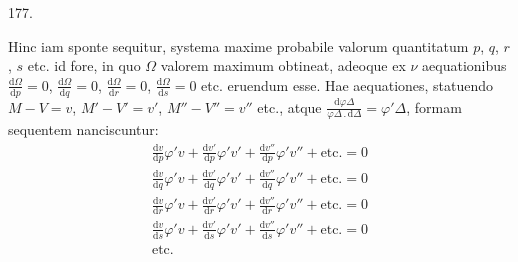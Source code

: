 \begin{center}\hypertarget{native-249-article177}{}177.\end{center}
Hinc iam sponte sequitur, systema maxime probabile valorum quantitatum
$p$, $q$, $r$, $s$ etc. id fore, in quo $\Omega$ valorem maximum obtineat,
adeoque ex $\nu$ aequationibus $\frac{\mathrm{d}\Omega}{\mathrm{d}p}=0$,
$\frac{\mathrm{d}\Omega}{\mathrm{d}q}=0$,
$\frac{\mathrm{d}\Omega}{\mathrm{d}r}=0$,
$\frac{\mathrm{d}\Omega}{\mathrm{d}s}=0$ etc. eruendum esse. Hae aequationes,
statuendo $M-V=v$, $M'-V'=v'$, $M''-V''=v''$ etc., atque
$\frac{\mathrm{d}\varphi\Delta}{\varphi\Delta\,.\,\mathrm{d}\Delta}=\varphi'\Delta$,
formam sequentem nanciscuntur:
\[
\begin{gathered}
\frac{\mathrm{d}v}{\mathrm{d}p}\varphi'v+
\frac{\mathrm{d}v'}{\mathrm{d}p}\varphi'v'+
\frac{\mathrm{d}v''}{\mathrm{d}p}\varphi'v''+\text{etc.}=0\\
\frac{\mathrm{d}v}{\mathrm{d}q}\varphi'v+
\frac{\mathrm{d}v'}{\mathrm{d}q}\varphi'v'+
\frac{\mathrm{d}v''}{\mathrm{d}q}\varphi'v''+\text{etc.}=0\\
\frac{\mathrm{d}v}{\mathrm{d}r}\varphi'v+
\frac{\mathrm{d}v'}{\mathrm{d}r}\varphi'v'+
\frac{\mathrm{d}v''}{\mathrm{d}r}\varphi'v''+\text{etc.}=0\\
\frac{\mathrm{d}v}{\mathrm{d}s}\varphi'v+
\frac{\mathrm{d}v'}{\mathrm{d}s}\varphi'v'+
\frac{\mathrm{d}v''}{\mathrm{d}s}\varphi'v''+\text{etc.}=0\\
\text{etc.}
\end{gathered}
\]

